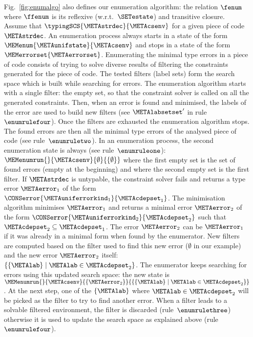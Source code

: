 \documentclass{jfp1}
\begin{document}
Fig.~\ref{fig:enumalgo} also defines our
%
%
%
enumeration algorithm: the
relation $\fenum$ where $\ffenum$ is its reflexive
(w.r.t.\ $\SETestate$) and transitive closure.
%
Assume that $\typingSCS{\METAstrdec}{\METAcsenv}$ for
a given piece of code $\METAstrdec$.
%
An enumeration process always starts in a state of the form
$\MEMenum{\METAunifstate}{\METAcsenv}$ and stops in a state of the
form $\MEMerrorset{\METAerrorset}$.
%
Enumerating the minimal type errors in a piece of code consists of
trying to solve diverse results of filtering
the constraints generated for the piece of code.  The tested filters
(label sets) form the search space which is built while searching for
errors.  The enumeration algorithm starts with a single filter: the
empty set, so that the constraint solver is called on all the
generated constraints.  Then, when an error is found and minimised,
the labels of the error are used to build new filters (see
$\METAlabsetset'$ in rule~$\enumrulefour$).
%
Once the filters are exhausted the enumeration algorithm stops.
The found errors are then all the minimal type errors of the analysed
piece of code (see rule~$\enumruletwo$).
%
In an enumeration process, the second enumeration state is always (see
rule~$\enumruleone$):
$\MEMenumrun{}{\METAcsenv}{\emptyset}{\{\emptyset\}}$
where the first empty set is the set of found errors (empty at the
beginning) and where the second empty set is the first filter.
If $\METAstrdec$ is untypable, the constraint solver fails and
returns a type error $\METAerror_1$ of the form
$\CONSerror{\METAuniferrorkind_1}{\METAcdepset_1}$.
The minimisation algorithm
minimises $\METAerror_1$ and returns a minimal error
$\METAerror_2$ of the form
$\CONSerror{\METAuniferrorkind_2}{\METAcdepset_2}$ such that
$\METAcdepset_2\subseteq\METAcdepset_1$.
The error $\METAerror_2$ can be $\METAerror_1$ if it was already in a
minimal form when found by the enumerator.
%
New filters are computed based on the filter used to find this
new error ($\emptyset$ in our example) and the new error
$\METAerror_2$ itself:
$\{\{\METAlab\}\mid\METAlab\in\METAcdepset_2\}$.  The
enumerator keeps searching for errors using this updated search
space: the new state is
$\MEMenumrun{}{\METAcsenv}{\{\METAerror_2\}}{\{\{\METAlab\}\mid\METAlab\in\METAcdepset_2\}}$.
At the next step, one of the $\{\METAlab\}$ where
$\METAlab\in\METAcdepset_2$ will be picked as the filter to
try to find another error.  When a filter leads to a solvable filtered
environment, the filter is discarded (rule~$\enumrulethree$) otherwise
it is used to update the search space as explained above
(rule~$\enumrulefour$).
\end{document}
